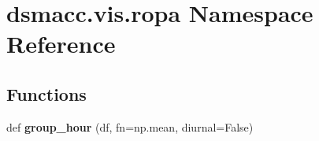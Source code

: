 \hypertarget{namespacedsmacc_1_1vis_1_1ropa}{}\section{dsmacc.\+vis.\+ropa Namespace Reference}
\label{namespacedsmacc_1_1vis_1_1ropa}
\subsection*{Functions}
\begin{DoxyCompactItemize}
\item 
\mbox{\label{namespacedsmacc_1_1vis_1_1ropa_abae042856b3427128c714d72113902f5}} 
def {\bfseries group\+\_\+hour} (df, fn=np.\+mean, diurnal=False)
\end{DoxyCompactItemize}
